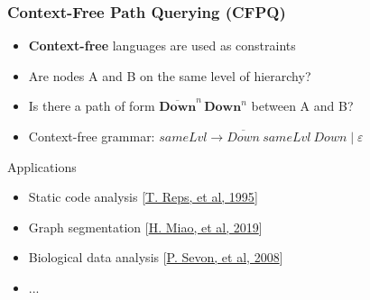 \documentclass[xcolor=table,aspectratio=169]{beamer}
\begin{document}
\begin{frame}[fragile] \frametitle{Context-Free Path Querying (CFPQ)}
      \begin{minipage}[m]{0.45\linewidth}
  \end{minipage}\hfill
  \begin{minipage}[m]{0.5\linewidth}    
  \begin{itemize}
        \item \textbf{Context-free} languages are used as constraints 
        \item Are nodes A and B on the same level of hierarchy?
        \item Is there a path of form $\overline{\textbf{Down}}^n \, \textbf{Down}^n$ between A and B?
        \item Context-free grammar: $\textit{sameLvl} \to \overline{\textit{Down}} \ \textit{sameLvl} \ \textit{Down} \mid \varepsilon$
  \end{itemize}
  \pause
  Applications
    \begin{itemize}
      \item Static code analysis [\href{https://dl.acm.org/doi/10.1145/199448.199462}{T. Reps, et al, 1995}]
      \item Graph segmentation [\href{https://dblp.org/rec/conf/icde/0001D19.html}{H. Miao, et al, 2019}]
      \item Biological data analysis [\href{https://pubmed.ncbi.nlm.nih.gov/20134073/}{P. Sevon, et al, 2008}]
      \item ...      
    \end{itemize}
    
  \end{minipage}

  \end{frame}
\end{document}
